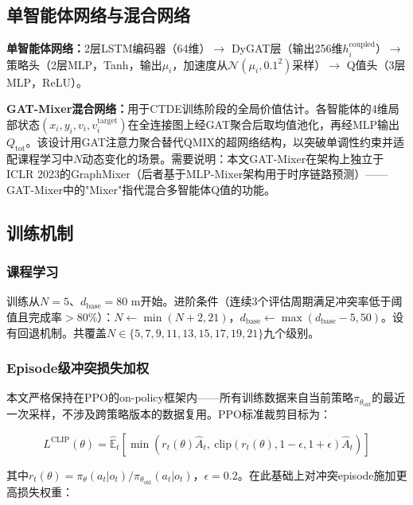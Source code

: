 \documentclass[12pt,a4paper,UTF8]{ctexart}
\begin{document}
\subsection{单智能体网络与混合网络}

\textbf{单智能体网络：}2层LSTM编码器（64维）$\to$ DyGAT层（输出256维$h_i^{\text{coupled}}$）$\to$ 策略头（2层MLP，Tanh，输出$\mu_i$，加速度从$\mathcal{N}(\mu_i, 0.1^2)$采样）$\to$ Q值头（3层MLP，ReLU）。

\textbf{GAT-Mixer混合网络：}用于CTDE训练阶段的全局价值估计。各智能体的4维局部状态$(x_i, y_i, v_i, v_i^{\text{target}})$在全连接图上经GAT聚合后取均值池化，再经MLP输出$Q_{\text{tot}}$。该设计用GAT注意力聚合替代QMIX的超网络结构，以突破单调性约束并适配课程学习中$N$动态变化的场景。需要说明：本文GAT-Mixer在架构上独立于ICLR 2023的GraphMixer\cite{ref28}（后者基于MLP-Mixer架构用于时序链路预测）——GAT-Mixer中的"Mixer"指代混合多智能体Q值的功能。

\subsection{训练机制}

\subsubsection{课程学习}

训练从$N=5$、$d_{\text{base}}=80$ m开始。进阶条件（连续3个评估周期满足冲突率低于阈值且完成率$>80\%$）：$N \leftarrow \min(N+2, 21)$，$d_{\text{base}} \leftarrow \max(d_{\text{base}}-5, 50)$。设有回退机制。共覆盖$N \in \{5, 7, 9, 11, 13, 15, 17, 19, 21\}$九个级别。

\subsubsection{Episode级冲突损失加权}

本文严格保持在PPO的on-policy框架内——所有训练数据来自当前策略$\pi_{\theta_{\text{old}}}$的最近一次采样，不涉及跨策略版本的数据复用。PPO标准裁剪目标为：

\begin{equation}
    L^{\text{CLIP}}(\theta) = \hat{\mathbb{E}}_t\!\left[\min\!\left(r_t(\theta)\hat{A}_t,\ \text{clip}(r_t(\theta), 1-\epsilon, 1+\epsilon)\hat{A}_t\right)\right]
\end{equation}

其中$r_t(\theta) = \pi_\theta(a_t|o_t) / \pi_{\theta_{\text{old}}}(a_t|o_t)$，$\epsilon = 0.2$。在此基础上对冲突episode施加更高损失权重：
\end{document}

